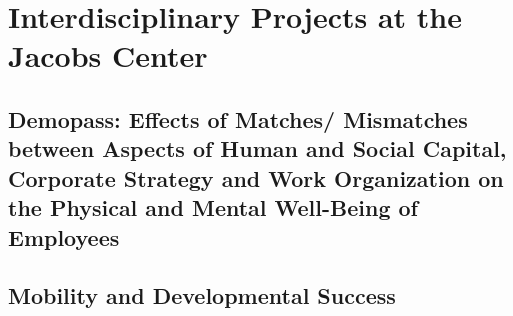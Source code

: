 \section{Interdisciplinary Projects at the Jacobs Center} 


\subsection{Demopass: Effects of Matches/ Mismatches between Aspects of Human and Social Capital, Corporate Strategy and Work Organization on the Physical and Mental Well-Being of Employees	}




\subsection{Mobility and Developmental Success }



